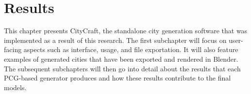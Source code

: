 \chapter{Results}

This chapter presents CityCraft, the standalone city generation software that was implemented as a result of this research.
The first subchapter will focus on user-facing aspects such as interface, usage, and file exportation.
It will also feature examples of generated cities that have been exported and rendered in Blender.
The subsequent subchapters will then go into detail about the results that each PCG-based generator produces and how these results contribute to the final models.










